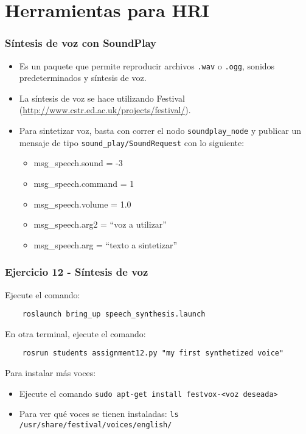 \section{Herramientas para HRI}

\begin{frame}\frametitle{Síntesis de voz con SoundPlay}
  \begin{itemize}
  \item Es un paquete que permite reproducir archivos \texttt{.wav} o \texttt{.ogg}, sonidos predeterminados y síntesis de voz.
  \item La síntesis de voz se hace utilizando Festival (\url{http://www.cstr.ed.ac.uk/projects/festival/}).
  \item Para sintetizar voz, basta con correr el nodo \texttt{soundplay\_node} y publicar un mensaje de tipo \texttt{sound\_play/SoundRequest} con lo siguiente:
    \begin{itemize}
    \item msg\_speech.sound   = -3                 
    \item msg\_speech.command = 1                  
    \item msg\_speech.volume  = 1.0                
    \item msg\_speech.arg2    = ``voz a utilizar''
    \item msg\_speech.arg = ``texto a sintetizar''
    \end{itemize}
  \end{itemize}
\end{frame}

\begin{frame}[containsverbatim]\frametitle{Ejercicio 12 - Síntesis de voz}
  Ejecute el comando:
  \begin{lstlisting}
    roslaunch bring_up speech_synthesis.launch
  \end{lstlisting}
  En otra terminal, ejecute el comando:
  \begin{lstlisting}
    rosrun students assignment12.py "my first synthetized voice"
  \end{lstlisting}
  Para instalar más voces:
  \begin{itemize}
  \item Ejecute el comando \texttt{sudo apt-get install festvox-<voz deseada>}
  \item Para ver qué voces se tienen instaladas: \texttt{ls /usr/share/festival/voices/english/}
  \end{itemize}
\end{frame}

